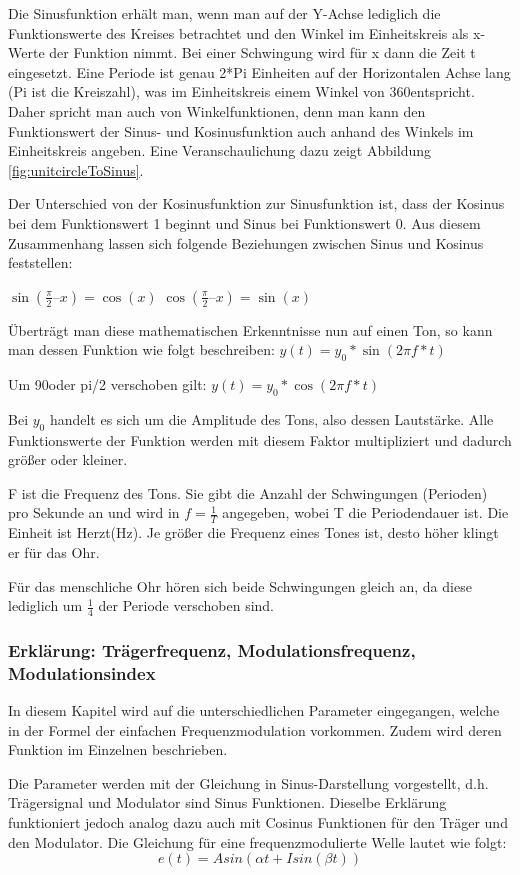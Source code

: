 Die Sinusfunktion erhält man, wenn man auf der Y-Achse lediglich die Funktionswerte des Kreises betrachtet und den Winkel im Einheitskreis als x-Werte der Funktion nimmt. Bei einer Schwingung wird für x dann die Zeit t eingesetzt. Eine Periode ist genau 2*Pi Einheiten auf der Horizontalen Achse lang (Pi ist die Kreiszahl), was im Einheitskreis einem Winkel von 360\degree entspricht. Daher spricht man auch von Winkelfunktionen, denn man kann den Funktionswert der Sinus- und Kosinusfunktion auch anhand des Winkels im Einheitskreis angeben. Eine Veranschaulichung dazu zeigt Abbildung \ref{fig:unitcircleToSinus}.

Der Unterschied von der Kosinusfunktion zur Sinusfunktion ist, dass der Kosinus bei dem Funktionswert 1 beginnt und Sinus bei Funktionswert 0. Aus diesem Zusammenhang lassen sich folgende Beziehungen zwischen Sinus und Kosinus feststellen:

$\sin(\frac {\pi}{2} – x) =\cos(x)$
$\cos(\frac {\pi}{2} – x) = \sin(x)$

Überträgt man diese mathematischen Erkenntnisse nun auf einen Ton, so kann man dessen Funktion wie folgt beschreiben: 		$y(t) = y_0 * \sin(2 \pi f * t)$

Um 90\degree oder pi/2 verschoben gilt: 		$y(t) = y_0*\cos(2 \pi f*t)$

Bei $y_0$ handelt es sich um die Amplitude des Tons, also dessen Lautstärke. Alle Funktionswerte der Funktion werden mit diesem Faktor multipliziert und dadurch größer oder kleiner.

F ist die Frequenz des Tons. Sie gibt die Anzahl der Schwingungen (Perioden) pro Sekunde an und wird in $f=\frac{1}{T}$ angegeben, wobei T die Periodendauer ist. Die Einheit ist Herzt(Hz).
Je größer die Frequenz eines Tones ist, desto höher klingt er für das Ohr.

Für das menschliche Ohr hören sich beide Schwingungen gleich an, da diese lediglich um $\frac{1}{4}$ der Periode verschoben sind. 

\subsubsection{Erklärung: Trägerfrequenz, Modulationsfrequenz, Modulationsindex}

In diesem Kapitel wird auf die unterschiedlichen Parameter eingegangen, welche in der Formel der einfachen Frequenzmodulation vorkommen. Zudem wird deren Funktion im Einzelnen beschrieben.

Die Parameter werden mit der Gleichung in Sinus-Darstellung vorgestellt, d.h. Trägersignal und Modulator sind Sinus Funktionen. Dieselbe Erklärung funktioniert jedoch analog dazu auch mit Cosinus Funktionen für den Träger und den Modulator.
Die Gleichung für eine frequenzmodulierte Welle lautet wie folgt:
\[ e(t) = A sin(\alpha t + I sin(\beta t)) \]

